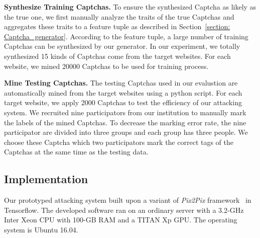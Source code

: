 \noindent \textbf{Synthesize Training Captchas.} To ensure the synthesized Captcha as likely as the true one, we first manually analyze the traits of the true Captchas and aggregates these traits to a feature tuple as described in Section~\ref{section: Captcha_generator}. According to the feature tuple, a large number of training Captchas can be synthesized by our generator. In our experiment, we totally synthesized 15 kinds of Captchas come from the target websites. For each website, we mined 20000 Captchas to be used for training process.

\noindent \textbf{Mine Testing Captchas.} The testing Captchas used in our evalustion are automatically mined from the target websites using a python script. For each target website, we apply 2000 Captchas to test the efficiency of our attacking system.  We recruited nine participators from our institution to manually mark the labels of the mined Captchas. To decrease the marking error rate, the nine participator are divided into three groups and each group has three people. We choose these Captcha which two participators mark the correct tags of the Captchas at the same time as the testing data.

\subsection{Implementation} 
Our prototyped attacking system built upon a variant of \emph{Pix2Pix} framework~\cite{Pix2PixCode} in Tensorflow. The developed software ran on an ordinary
server with a 3.2-GHz Inter Xeon CPU with 100-GB RAM and a TITAN Xp GPU. The operating system is Ubuntu 16.04.

